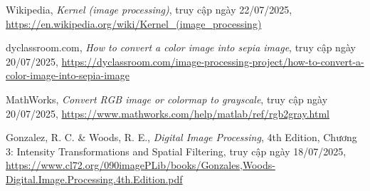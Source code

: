 \begin{thebibliography}{9}

  Wikipedia, 
  \textit{Kernel (image processing)}, truy cập ngày 22/07/2025,
  \newline
  \url{https://en.wikipedia.org/wiki/Kernel_(image_processing)}

  dyclassroom.com, 
  \textit{How to convert a color image into sepia image}, truy cập ngày 20/07/2025,
  \newline
  \url{https://dyclassroom.com/image-processing-project/how-to-convert-a-color-image-into-sepia-image}

  MathWorks, 
  \textit{Convert RGB image or colormap to grayscale}, truy cập ngày 20/07/2025,
  \newline
  \url{https://www.mathworks.com/help/matlab/ref/rgb2gray.html}

  Gonzalez, R. C. \& Woods, R. E., 
  \textit{Digital Image Processing}, 4th Edition, Chương 3: Intensity Transformations and Spatial Filtering, truy cập ngày 18/07/2025,
  \newline
  \url{https://www.cl72.org/090imagePLib/books/Gonzales,Woods-Digital.Image.Processing.4th.Edition.pdf}

\end{thebibliography}

